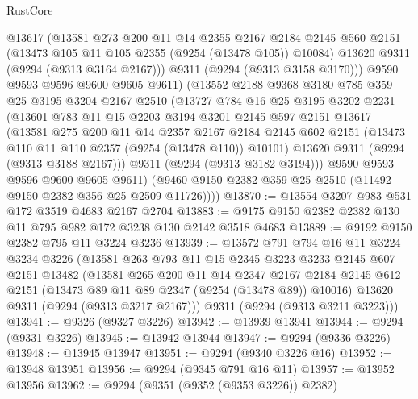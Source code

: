 \begin{lexlean}{RustCore}
\begin{coremodule}
          @13617
          (@13581
            @273
            @200
            @11
            @14
            @2355
            @2167
            @2184
            @2145
            @560
            @2151
            (@13473 @105 @11 @105 @2355 (@9254 (@13478 @105)) @10084)
            @13620
            @9311
            (@9294 (@9313 @3164 @2167)))
          @9311
          (@9294 (@9313 @3158 @3170)))
        @9590
        @9593
        @9596
        @9600
        @9605
        @9611)
      (@13552
        @2188
        @9368
        @3180
        @785
        @359
        @25
        @3195
        @3204
        @2167
        @2510
        (@13727
          @784
          @16
          @25
          @3195
          @3202
          @2231
          (@13601
            @783
            @11
            @15
            @2203
            @3194
            @3201
            @2145
            @597
            @2151
            @13617
            (@13581
              @275
              @200
              @11
              @14
              @2357
              @2167
              @2184
              @2145
              @602
              @2151
              (@13473 @110 @11 @110 @2357 (@9254 (@13478 @110)) @10101)
              @13620
              @9311
              (@9294 (@9313 @3188 @2167)))
            @9311
            (@9294 (@9313 @3182 @3194)))
          @9590
          @9593
          @9596
          @9600
          @9605
          @9611)
        (@9460 @9150 @2382 @359 @25 @2510 (@11492 @9150 @2382 @356 @25 @2509 @11726))))
@13870 := @13554 @3207 @983 @531 @172 @3519 @4683 @2167 @2704
@13883 := @9175 @9150 @2382 @2382 @130 @11 @795 @982 @172 @3238 @130 @2142 @3518 @4683
@13889 := @9192 @9150 @2382 @795 @11 @3224 @3236
@13939 := @13572
    @791
    @794
    @16
    @11
    @3224
    @3234
    @3226
    (@13581
      @263
      @793
      @11
      @15
      @2345
      @3223
      @3233
      @2145
      @607
      @2151
      @13482
      (@13581
        @265
        @200
        @11
        @14
        @2347
        @2167
        @2184
        @2145
        @612
        @2151
        (@13473 @89 @11 @89 @2347 (@9254 (@13478 @89)) @10016)
        @13620
        @9311
        (@9294 (@9313 @3217 @2167)))
      @9311
      (@9294 (@9313 @3211 @3223)))
@13941 := @9326 (@9327 @3226)
@13942 := @13939 @13941
@13944 := @9294 (@9331 @3226)
@13945 := @13942 @13944
@13947 := @9294 (@9336 @3226)
@13948 := @13945 @13947
@13951 := @9294 (@9340 @3226 @16)
@13952 := @13948 @13951
@13956 := @9294 (@9345 @791 @16 @11)
@13957 := @13952 @13956
@13962 := @9294 (@9351 (@9352 (@9353 @3226)) @2382)

\end{coremodule}
\end{lexlean}
